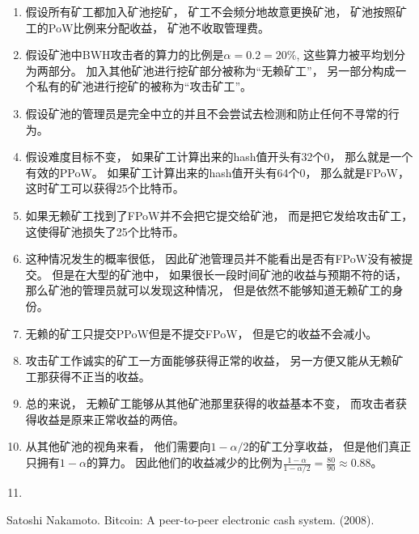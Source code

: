 \documentclass[a4paper, 11pt]{article}
\begin{document}
\begin{CJK*}{UTF8}{gbsn}
    \begin{enumerate}
        \item 假设所有矿工都加入矿池挖矿，
        矿工不会频分地故意更换矿池，
        矿池按照矿工的PoW比例来分配收益，
        矿池不收取管理费。
        \item 假设矿池中BWH攻击者的算力的比例是$\alpha = 0.2 = 20\%$,
        这些算力被平均划分为两部分。
        加入其他矿池进行挖矿部分被称为“无赖矿工”，
        另一部分构成一个私有的矿池进行挖矿的被称为“攻击矿工”。
        \item 假设矿池的管理员是完全中立的并且不会尝试去检测和防止任何不寻常的行为。
        \item 假设难度目标不变，
        如果矿工计算出来的hash值开头有32个0，
        那么就是一个有效的PPoW。
        如果矿工计算出来的hash值开头有64个0，
        那么就是FPoW，
        这时矿工可以获得25个比特币。
        \item 如果无赖矿工找到了FPoW并不会把它提交给矿池，
        而是把它发给攻击矿工，
        这使得矿池损失了25个比特币。
        \item 这种情况发生的概率很低，
        因此矿池管理员并不能看出是否有FPoW没有被提交。
        但是在大型的矿池中，
        如果很长一段时间矿池的收益与预期不符的话，
        那么矿池的管理员就可以发现这种情况，
        但是依然不能够知道无赖矿工的身份。
        \item 无赖的矿工只提交PPoW但是不提交FPoW，
        但是它的收益不会减小。
        \item 攻击矿工作诚实的矿工一方面能够获得正常的收益，
        另一方便又能从无赖矿工那获得不正当的收益。
        \item 总的来说，
        无赖矿工能够从其他矿池那里获得的收益基本不变，
        而攻击者获得收益是原来正常收益的两倍。
        \item 从其他矿池的视角来看，
        他们需要向$1 - \alpha/2$的矿工分享收益，
        但是他们真正只拥有$1 - \alpha$的算力。
        因此他们的收益减少的比例为$\frac{1-\alpha}{1-\alpha/2} = \frac{80}{90} \approx 0.88$。
        \item 

    \end{enumerate}






    \clearpage

    \begin{thebibliography}{8}

    Satoshi Nakamoto. Bitcoin: A peer-to-peer electronic cash system. (2008).


\end{thebibliography}
\end{CJK*}
\end{document}
